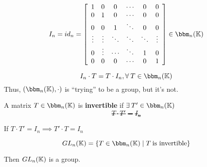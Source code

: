 \begin{definition} 
    \[
        I_n = id_n = \left[
            \begin{array}{cccccc}
                1      & 0      & 0      & \cdots & 0      & 0      \\
                0      & 1      & 0      & \cdots & 0      & 0      \\
                0      & 0      & 1      & \ddots & 0      & 0      \\
                \vdots & \vdots & \ddots & \ddots & \ddots & \vdots \\
                0      & \vdots & \cdots      & \ddots & 1      & 0      \\
                0      & 0      & 0      & \cdots & 0      & 1      \\
            \end{array}
            \right] \in \bbm_n(\bbk)
    \]
\end{definition}

\begin{observe}
    \[
        I_n \cdot T = T \cdot I_n, \forall T \in \bbm_n(\bbk)
    \]
    Thus, \((\bbm_n(\bbk), \cdot)\) is ``trying'' to be a group, but it's not.
\end{observe}

\begin{definition} 
    A matrix \(T \in \bbm_n(\bbk)\) is \textbf{invertible} if \(\exists T' \in \bbm_n(\bbk)\) \st \[T \cdot T' = I_n\]
\end{definition}
\begin{exercise}
    If \(T \cdot T' = I_n \implies T' \cdot T = I_n\)
\end{exercise}

\begin{definition} 
    \[GL_n(\bbk) = \{T\in \bbm_n(\bbk) \mid T \:\text{is invertible}\}\]
\end{definition}

\begin{remark}
    Then \(GL_n(\mathbb{K})\) is a group.
\end{remark}

